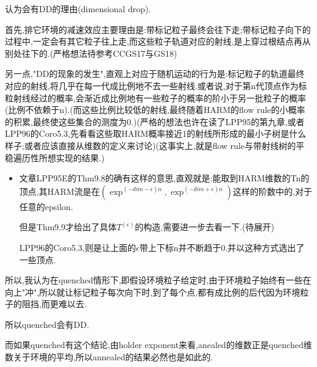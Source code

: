 \documentclass[a4paper,oneside]{ctexbook}
\begin{document}
				\begin{conjec}

					认为会有DD的理由(dimensional drop).

					首先,排它环境的减速效应主要理由是:带标记粒子最终会往下走;带标记粒子向下的过程中,一定会有其它粒子往上走,而这些粒子轨道对应的射线,是上穿过根结点再从别处往下的.(严格想法待参考CCGS17与GS18)

					另一点,"DD的现象的发生",直观上对应于随机运动的行为是:标记粒子的轨道最终对应的射线,将几乎在每一代成比例地不去一些射线.或者说,对于第n代顶点作为标粒射线经过的概率,会渐近成比例地有一些粒子的概率的阶小于另一批粒子的概率(比例不依赖于n).(而这些比例比较低的射线,最终随着HARM的flow rule的小概率的积累,最终使这些集合的测度为0.)(严格的想法也许在读了LPP95的第九章,或者LPP96的Coro5.3,先看看这些取HARM概率接近1的射线所形成的最小子树是什么样子;或者应该直接从维数的定义来讨论)(这事实上,就是flow rule与带射线树的平稳遍历性所想实现的结果.)

						\begin{itemize}
							\item 

							文章LPP95E的Thm9.8的确有这样的意思,直观就是:能取到HARM维数的Tn的顶点,其HARM流是在$(\exp^{(-dim-\epsilon)n},\exp^{(-dim+\epsilon)n})$这样的阶数中的,对于任意的epsilon.

							但是Thm9.9才给出了具体$T^(\epsilon)$的构造,需要进一步去看一下.(待展开)

							LPP96的Coro5.3,则是让上面的$\epsilon$带上下标n并不断趋于0.并以这种方式选出了一些顶点.
						\end{itemize}

					所以,我认为在quenched情形下,即假设环境粒子给定时,由于环境粒子始终有一些在向上"冲",所以就让标记粒子每次向下时,到了每个点,都有成比例的后代因为环境粒子的阻挡,而更难以去.

					所以quenched会有DD.

					而如果quenched有这个结论,由holder exponent来看,anealed的维数正是quenched维数关于环境的平均,所以annealed的结果必然也是如此的.
				\end{conjec}
\end{document}
